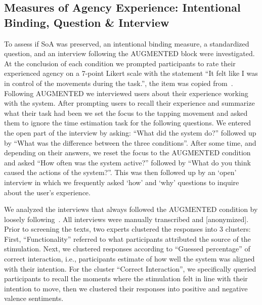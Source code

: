 
\subsection{Measures of Agency Experience: Intentional Binding, Question \& Interview}
To assess if SoA was preserved, an intentional binding measure, a standardized question, and an interview following the AUGMENTED block were investigated. At the conclusion of each condition we prompted participants to rate their experienced agency on a 7-point Likert scale with the statement ``It felt like I was in control of the movements during the task.'', the item was copied from~\cite{Hornbaek}. Following AUGMENTED we interviewed users about their experience working with the system. After prompting users to recall their experience and summarize what their task had been we set the focus to the tapping movement and asked them to ignore the time estimation task for the following questions. We entered the open part of the interview by asking: ``What did the system do?'' followed up by ``What was the difference between the three conditions''. After some time, and depending on their answers, we reset the focus to the AUGMENTED condition and asked ``How often was the system active?'' followed by ``What do you think caused the actions of the system?''. This was then followed up by an `open' interview in which we frequently asked `how' and `why' questions to inquire about the user's experience.

We analyzed the interviews that always followed the AUGMENTED condition by loosely following~\citet{Mayring2015-pp}. All interviews were manually transcribed and [anonymized]. Prior to screening the texts, two experts clustered the responses into 3 clusters: First, ``Functionality'' referred to what participants attributed the source of the stimulation. Next, we clustered responses according to ``Guessed percentage'' of correct interaction, i.e., participants estimate of how well the system was aligned with their intention. For the cluster ``Correct Interaction'', we specifically queried participants to recall the moments where the stimulation felt in line with their intention to move, then we clustered their responses into positive and negative valence sentiments. 

